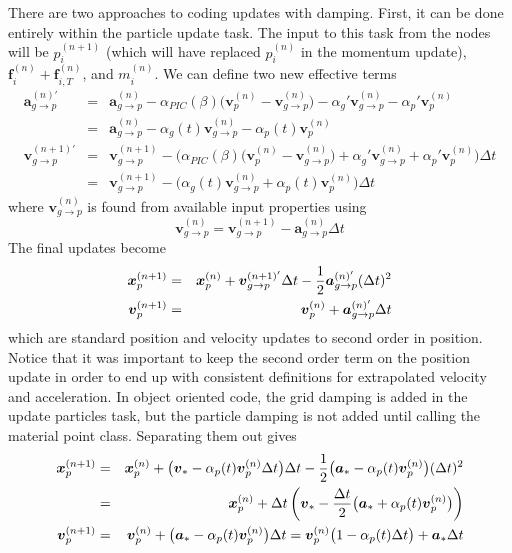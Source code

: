 \documentclass[11pt]{article}
\renewcommand{\vec}[1]{\boldsymbol{#1}}
\begin{document}
There are two approaches to coding updates with damping. First, it can be done entirely within the particle update task. The input to this task from  the nodes will be $p_i^{(n+1)}$ (which will have replaced $p_i^{(n)}$ in the momentum update), $ \vec f_{i}^{(n)} + \vec f_{i,T}^{(n)}$, and  $m_i^{(n)}$. We can define two new effective terms
\begin{eqnarray}
    \vec{a}_{g\to p}^{(n)'} & = &  \vec{a}_{g\to p}^{(n)} - \alpha_{PIC}(\beta)\bigl(\vec v_p^{(n)}-\vec v_{g\to p}^{(n)}\bigr)
         -  \alpha_g'\vec{v}_{g\to p}^{(n)} -  \alpha_p'\vec{v}_p^{(n)} \\
         & = & \vec{a}_{g\to p}^{(n)} -  \alpha_g(t)\vec{v}_{g\to p}^{(n)} -  \alpha_p(t)\vec{v}_p^{(n)}  \\
    \vec v_{g\to p}^{(n+1)'} & = & \vec v_{g\to p}^{(n+1)} - \biggl(\alpha_{PIC}(\beta)\bigl(\vec v_p^{(n)}-\vec v_{g\to p}^{(n)}\bigr)
         +  \alpha_g'\vec{v}_{g\to p}^{(n)} + \alpha_p'\vec{v}_p^{(n)}\biggr)\Delta t \\
         & = & \vec v_{g\to p}^{(n+1)} - \biggl( \alpha_g(t)\vec{v}_{g\to p}^{(n)} + \alpha_p(t)\vec{v}_p^{(n)}\biggr)\Delta t
\end{eqnarray}
where $\vec v_{g\to p}^{(n)}$ is found from available input properties using
\begin{equation}
 \vec v_{g\to p}^{(n)}  =  \vec v_{g\to p}^{(n+1)}  - \vec{a}_{g\to p}^{(n)}\Delta t
\end{equation}
The final updates become
\begin{eqnarray}
   \vec{x}_{p}^{(n+1)} & = & \vec{x}_p^{(n)} +\vec v_{g\to p}^{(n+1)'}\Delta t - {1\over 2}\vec{a}_{g\to p}^{(n)'}(\Delta t)^2  \\
   \vec{v}_{p}^{(n+1)} & = & \vec{v}_p^{(n)} + \vec{a}_{g\to p}^{(n)'}\Delta t 
\end{eqnarray}
which are standard position and velocity updates to second order in position. Notice that it was important to keep the second order term on the position update in order to end up with consistent definitions for extrapolated velocity and acceleration. In object oriented code, the grid damping is added in the update particles task, but the particle damping is not added until calling the material point class. Separating them out gives
\begin{eqnarray}
   \vec{x}_{p}^{(n+1)} & = & \vec{x}_p^{(n)} +\bigl(\vec v_* - \alpha_p(t)\vec{v}_p^{(n)}\Delta t\bigr)\Delta t - {1\over 2}\bigl(\vec{a}_* -  \alpha_p(t)\vec{v}_p^{(n)} \bigr)(\Delta t)^2  \\
      & = & \vec{x}_p^{(n)} +\Delta t\left(\vec v_* - {\Delta t\over 2}\bigl(\vec{a}_* +  \alpha_p(t)\vec{v}_p^{(n)} \bigr)\right)  \\
   \vec{v}_{p}^{(n+1)} & = & \vec{v}_p^{(n)} +\bigl(\vec{a}_* -  \alpha_p(t)\vec{v}_p^{(n)} \bigr)\Delta t 
           =  \vec{v}_p^{(n)}\bigl(1 -  \alpha_p(t)\Delta t \bigr)  + \vec{a}_* \Delta t
\end{eqnarray}
\end{document}
